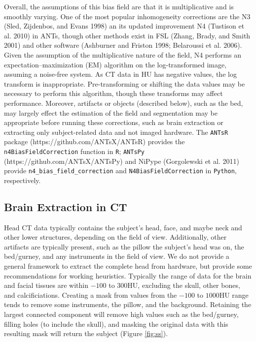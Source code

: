 \documentclass[]{elsarticle} %
\begin{document}
Overall, the assumptions of this bias field are that it is multiplicative and is smoothly varying. One of the most popular inhomogeneity corrections are the N3 (Sled, Zijdenbos, and Evans 1998) an its updated improvement N4 (Tustison et al. 2010) in ANTs, though other methods exist in FSL (Zhang, Brady, and Smith 2001) and other software (Ashburner and Friston 1998; Belaroussi et al. 2006). Given the assumption of the multiplicative nature of the field, N4 performs an expectation--maximization (EM) algorithm on the log-transformed image, assuming a noise-free system. As CT data in HU has negative values, the log transform is inappropriate. Pre-transforming or shifting the data values may be necessary to perform this algorithm, though these transforms may affect performance. Moreover, artifacts or objects (described below), such as the bed, may largely effect the estimation of the field and segmentation may be appropriate before running these corrections, such as brain extraction or extracting only subject-related data and not imaged hardware. The \texttt{ANTsR} package (https://github.com/ANTsX/ANTsR) provides the \texttt{n4BiasFieldCorrection} function in \texttt{R}; \texttt{ANTsPy} (https://github.com/ANTsX/ANTsPy) and NiPype (Gorgolewski et al. 2011) provide \texttt{n4\_bias\_field\_correction} and \texttt{N4BiasFieldCorrection} in \texttt{Python}, respectively.

\hypertarget{brain-extraction-in-ct}{%
\subsection{Brain Extraction in CT}\label{brain-extraction-in-ct}}

Head CT data typically contains the subject's head, face, and maybe neck and other lower structures, depending on the field of view. Additionally, other artifacts are typically present, such as the pillow the subject's head was on, the bed/gurney, and any instruments in the field of view. We do not provide a general framework to extract the complete head from hardware, but provide some recommendations for working heuristics. Typically the range of data for the brain and facial tissues are within \(-100\) to \(300\)HU, excluding the skull, other bones, and calcificiations. Creating a mask from values from the \(-100\) to \(1000\)HU range tends to remove some instruments, the pillow, and the background. Retaining the largest connected component will remove high values such as the bed/gurney, filling holes (to include the skull), and masking the original data with this resulting mask will return the subject (Figure \ref{fig:ss}).
\end{document}
